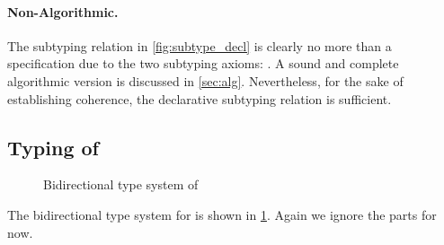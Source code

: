 \paragraph{Non-Algorithmic.}
The subtyping relation in \cref{fig:subtype_decl} is clearly no more than a
specification due to the two subtyping axioms: . A sound
and complete algorithmic version is discussed in \cref{sec:alg}. Nevertheless,
for the sake of establishing coherence, the declarative subtyping relation is
sufficient.


\subsection{Typing of \name}


\begin{figure}[t]
  \centering
{}
  \caption{Bidirectional type system of \name}
  \label{fig:type_system}
\end{figure}

\renewcommand{\rulehl}[1]{#1}



The bidirectional type system for \name is shown in \cref{fig:type_system}.
Again we ignore the  parts for now.


\begin{comment}
Unlike the development of \oname, which first presents a type assignment
specification, \Cref{fig:type_system} directly present the bidirectional type
system of \name.
Unfortunately, we found that their declarative type
system is incoherent in nature (even with all the syntactic restrictions).
\jeremy{perhaps add a counter example somewhere?} Again, the reader is advised
to continue ignoring the gray-shaded parts until \cref{sec:elaboration}.
\tom{The above story is a bit confusing to me. Is it the case that the
     \oname paper already was aware of the coherence problem with its
     declarative type system and for that reason (and inference) presented
     a bidirection type system as well? If so, that's not clear.} \jeremy{I
     remember at one point Bruno and I believed the declarative system is
     coherent, it's just hard to prove. Then I found a counterexample. That was
     after \tname paper.  }
\end{comment}


